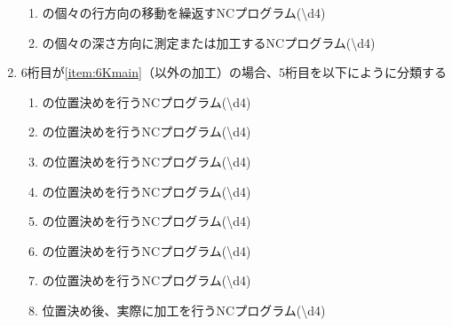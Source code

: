 \begin{enumerate}[label=\alph*)]
\begin{enumerate}[label=\arabic*., ref=\arabic*]
  \item \Dimple の個々の行方向の移動を繰返すNCプログラム({\textbackslash d{4}})
  \item \Dimple の個々の深さ方向に測定または加工するNCプログラム({\textbackslash d{4}})
  \end{enumerate}
\item 6桁目が\ref{item:6Kmain}（\Dimple 以外の加工）の場合、5桁目を以下にように分類する
  \begin{enumerate}[label=\arabic*., ref=\arabic*, start=1]
  \item\label{item:5KF}
    \EndFacecutMilling の位置決めを行うNCプログラム({\textbackslash d{4}})
  \item\label{item:5KO} \OutcutMilling の位置決めを行うNCプログラム({\textbackslash d{4}})
  \item\label{item:5KK}
    \KeywayMilling の位置決めを行うNCプログラム({\textbackslash d{4}})
  \item\label{item:5KCO}
    \EndFaceOutCChamferMilling の位置決めを行うNCプログラム({\textbackslash d{4}})
  \item\label{item:5KCI}
    \EndFaceInCChamferMilling の位置決めを行うNCプログラム({\textbackslash d{4}})
  \item\label{item:5KZ}
    \EndFaceBoringMilling の位置決めを行うNCプログラム({\textbackslash d{4}})
  \item\label{item:5KI}
    \IncutBoringMilling の位置決めを行うNCプログラム({\textbackslash d{4}})
  \setcounter{enumii}{8}
  \item\label{item:5Ksub}
  位置決め後、実際に加工を行うNCプログラム({\textbackslash d{4}})
  \end{enumerate}
\end{enumerate}


